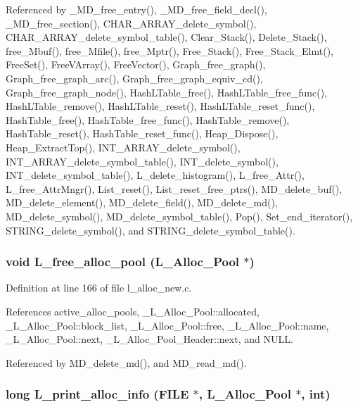 Referenced by \_\-MD\_\-free\_\-entry(), \_\-MD\_\-free\_\-field\_\-decl(), \_\-MD\_\-free\_\-section(), CHAR\_\-ARRAY\_\-delete\_\-symbol(), CHAR\_\-ARRAY\_\-delete\_\-symbol\_\-table(), Clear\_\-Stack(), Delete\_\-Stack(), free\_\-Mbuf(), free\_\-Mfile(), free\_\-Mptr(), Free\_\-Stack(), Free\_\-Stack\_\-Elmt(), Free\-Set(), Free\-VArray(), Free\-Vector(), Graph\_\-free\_\-graph(), Graph\_\-free\_\-graph\_\-arc(), Graph\_\-free\_\-graph\_\-equiv\_\-cd(), Graph\_\-free\_\-graph\_\-node(), Hash\-LTable\_\-free(), Hash\-LTable\_\-free\_\-func(), Hash\-LTable\_\-remove(), Hash\-LTable\_\-reset(), Hash\-LTable\_\-reset\_\-func(), Hash\-Table\_\-free(), Hash\-Table\_\-free\_\-func(), Hash\-Table\_\-remove(), Hash\-Table\_\-reset(), Hash\-Table\_\-reset\_\-func(), Heap\_\-Dispose(), Heap\_\-Extract\-Top(), INT\_\-ARRAY\_\-delete\_\-symbol(), INT\_\-ARRAY\_\-delete\_\-symbol\_\-table(), INT\_\-delete\_\-symbol(), INT\_\-delete\_\-symbol\_\-table(), L\_\-delete\_\-histogram(), L\_\-free\_\-Attr(), L\_\-free\_\-Attr\-Mngr(), List\_\-reset(), List\_\-reset\_\-free\_\-ptrs(), MD\_\-delete\_\-buf(), MD\_\-delete\_\-element(), MD\_\-delete\_\-field(), MD\_\-delete\_\-md(), MD\_\-delete\_\-symbol(), MD\_\-delete\_\-symbol\_\-table(), Pop(), Set\_\-end\_\-iterator(), STRING\_\-delete\_\-symbol(), and STRING\_\-delete\_\-symbol\_\-table().
\subsubsection{\setlength{\rightskip}{0pt plus 5cm}void L\_\-free\_\-alloc\_\-pool (\bf{L\_\-Alloc\_\-Pool} $\ast$)}\label{l__alloc__new_8h_b2b2253a1e6edae1fa73074e2161d171}




Definition at line 166 of file l\_\-alloc\_\-new.c.

References active\_\-alloc\_\-pools, \_\-L\_\-Alloc\_\-Pool::allocated, \_\-L\_\-Alloc\_\-Pool::block\_\-list, \_\-L\_\-Alloc\_\-Pool::free, \_\-L\_\-Alloc\_\-Pool::name, \_\-L\_\-Alloc\_\-Pool::next, \_\-L\_\-Alloc\_\-Pool\_\-Header::next, and NULL.

Referenced by MD\_\-delete\_\-md(), and MD\_\-read\_\-md().
\subsubsection{\setlength{\rightskip}{0pt plus 5cm}long L\_\-print\_\-alloc\_\-info (FILE $\ast$, \bf{L\_\-Alloc\_\-Pool} $\ast$, int)}\label{l__alloc__new_8h_8f60f151e54e589a7d10693af8e795c3}




